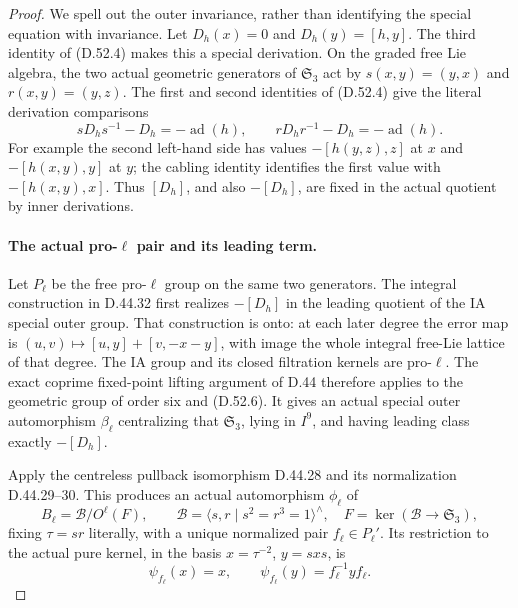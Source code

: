 \begin{proof}
We spell out the outer invariance, rather than identifying the
special equation with invariance. Let \(D_h(x)=0\) and
\(D_h(y)=[h,y]\). The third identity of \textup{(D.52.4)}
makes this a special derivation. On the graded free Lie algebra,
the two actual geometric generators of \(\mathfrak S_3\) act by
\(s(x,y)=(y,x)\) and \(r(x,y)=(y,z)\).
The first and second identities of \textup{(D.52.4)} give the
literal derivation comparisons
\[
 sD_hs^{-1}-D_h=-\operatorname{ad}(h),\qquad
 rD_hr^{-1}-D_h=-\operatorname{ad}(h).
 \tag{D.52.6}
\]
For example the second left-hand side has values
\(-[h(y,z),z]\) at \(x\) and \(-[h(x,y),y]\) at
\(y\); the cabling identity identifies the first value with
\(-[h(x,y),x]\). Thus \([D_h]\), and also \(-[D_h]\),
are fixed in the actual quotient by inner derivations.

\paragraph{The actual pro-\(\ell\) pair and its leading term.}
Let \(P_\ell\) be the free pro-\(\ell\) group on the same
two generators. The integral construction in D.44.32 first
realizes \(-[D_h]\) in the leading quotient of the IA special
outer group. That construction is onto: at each later degree
the error map is \((u,v)\mapsto[u,y]+[v,-x-y]\), with image
the whole integral free-Lie lattice of that degree. The IA group
and its closed filtration kernels are pro-\(\ell\).
The exact coprime fixed-point lifting argument of D.44 therefore
applies to the geometric group of order six and
\textup{(D.52.6)}. It gives an actual special outer automorphism
\(\beta_\ell\) centralizing that \(\mathfrak S_3\), lying
in \(I^9\), and having leading class exactly \(-[D_h]\).

Apply the centreless pullback isomorphism D.44.28 and its
normalization D.44.29--30. This produces an actual automorphism
\(\phi_\ell\) of
\[
 B_\ell=\mathcal B/O^\ell(F),\qquad
 \mathcal B=\langle s,r\mid s^2=r^3=1\rangle^{\wedge},
 \quad F=\ker(\mathcal B\to\mathfrak S_3),
 \tag{D.52.7}
\]
fixing \(\tau=sr\) literally, with a unique normalized pair
\(f_\ell\in P_\ell'\). Its restriction to the actual pure
kernel, in the basis \(x=\tau^{-2}\), \(y=sxs\), is
\[
              \psi_{f_\ell}(x)=x,\qquad
              \psi_{f_\ell}(y)=f_\ell^{-1}yf_\ell.
 \tag{D.52.8}
\]


\end{proof}
